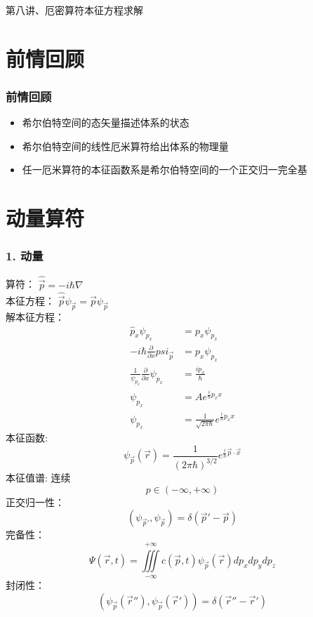 \begin{frame}
    \frametitle{}
    \begin{center}
    { {\huge 第八讲、厄密算符本征方程求解}}
    \end{center}    
\end{frame}


\section{前情回顾}

\begin{frame}
    \frametitle{前情回顾}
    \begin{itemize}
        \item 希尔伯特空间的态矢量描述体系的状态
        \item 希尔伯特空间的线性厄米算符给出体系的物理量
        \item 任一厄米算符的本征函数系是希尔伯特空间的一个正交归一完全基
    \end{itemize}   
\end{frame} 

\section{动量算符}
\begin{frame} [allowframebreaks=]
    \frametitle{1. 动量}
    算符：  $\hat{\vec p}=-i\hbar \nabla$ \\
    本征方程： $\hat{\vec p}\psi_{\vec p}=\vec p \psi_{\vec p}$ \\
    解本征方程：
    \begin{equation*}
        \begin{split}
            \hat{p}_x\psi_{p_x}&=p_x \psi_{p_x} \\
            -i\hbar\frac{\partial}{\partial x} psi_{\vec p} &= p_x \psi_{p_x}\\
            \frac{1}{\psi_{p_{x}}} \frac{\partial}{\partial x} \psi_{p_{x}}&=\frac{i p_{x}}{\hbar}\\
            \psi_{p_{x}}&=Ae^{\frac{i}{\hbar}p_x x} \\
            \psi_{p_{x}}&=\frac{1}{\sqrt{2\pi\hbar}}e^{\frac{i}{\hbar}p_x x}
        \end{split} 
    \end{equation*}
    本征函数: $$ \psi_{\vec{p}}(\vec{r})=\frac{1}{(2\pi\hbar)^{3/2}}e^{\frac{i}{\hbar}\vec{p}\cdot \vec{x}}   $$
    本征值谱: 连续
        $$ p \in (-\infty, +\infty) $$
    正交归一性：
        $$ (\psi_{\vec{p}'}, \psi_{\vec{p}}) =\delta(\vec{p}'-\vec{p})$$
    完备性：
    $$ \Psi(\vec{r},t)=\iiint\limits_{-\infty}^{+\infty}c(\vec{p},t) \psi_{\vec{p}}(\vec{r}) dp_xdp_ydp_z $$
    封闭性：$$ (\psi_{\vec{p}}(\vec{r}''), \psi_{\vec{p}}(\vec{r}')) =\delta(\vec{r}''-\vec{r}')$$
\end{frame} 

